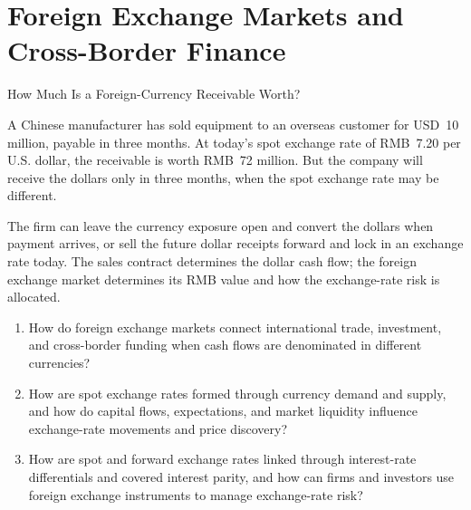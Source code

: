 \chapter{Foreign Exchange Markets and Cross-Border Finance}
\label{chap:Foreign_Exchange_Markets_and_Cross_Border_Finance}

\begin{openingcase}{How Much Is a Foreign-Currency Receivable Worth?}

A Chinese manufacturer has sold equipment to an overseas customer for USD~10 million, payable in three months. At today's spot exchange rate of RMB~7.20 per U.S. dollar, the receivable is worth RMB~72 million. But the company will receive the dollars only in three months, when the spot exchange rate may be different.

The firm can leave the currency exposure open and convert the dollars when payment arrives, or sell the future dollar receipts forward and lock in an exchange rate today. The sales contract determines the dollar cash flow; the foreign exchange market determines its RMB value and how the exchange-rate risk is allocated.

\end{openingcase}

\begin{tcolorbox}[
  enhanced,
  colback=FinanceBlue!6,
  colframe=FinanceBlue,
  boxrule=0.6pt,
  sharp corners,
  left=8pt,
  right=8pt,
  top=7pt,
  bottom=7pt,
  before skip=1em,
  after skip=1.6em,
  title=\textbf{Core Questions},
  coltitle=white,
  colbacktitle=FinanceBlue,
  fonttitle=\bfseries,
  attach boxed title to top left={xshift=6pt,yshift=-2mm},
  boxed title style={
    boxrule=0pt,
    sharp corners,
    left=5pt,
    right=5pt,
    top=2pt,
    bottom=2pt
  }
]
\begin{enumerate}[
  leftmargin=*,
  label=\textcolor{FinanceBlue}{\textbf{\arabic*.}},
  itemsep=0.55em,
  topsep=0.2em
]

\item How do foreign exchange markets connect
international trade, investment, and cross-border
funding when cash flows are denominated in different
currencies?

\item How are spot exchange rates formed through
currency demand and supply, and how do capital flows,
expectations, and market liquidity influence
exchange-rate movements and price discovery?

\item How are spot and forward exchange rates linked
through interest-rate differentials and covered
interest parity, and how can firms and investors
use foreign exchange instruments to manage
exchange-rate risk?

\end{enumerate}

\end{tcolorbox}

